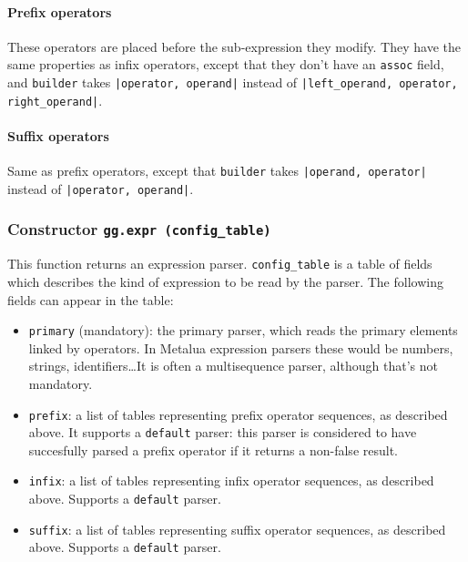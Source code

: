 

\paragraph{Prefix operators}
These operators are placed before the sub-expression they modify. They
have the same properties as infix operators, except that they don't
have an \verb|assoc| field, and \verb|builder| takes {\tt|operator,
  operand|} instead of {\tt|left\_operand, operator, right\_operand|}.

\paragraph{Suffix operators}
Same as prefix operators, except that \verb|builder| takes
{\tt|operand, operator|} instead of {\tt|operator, operand|}.

\subsubsection{Constructor {\tt gg.expr (config\_table)}}

This function returns an expression parser. \verb|config_table|
is a table of fields which describes the kind of expression to be
read by the parser. The following fields can appear in the table:

\begin{itemize}
\item\verb|primary| (mandatory): the primary parser, which reads the
  primary elements linked by operators. In Metalua expression parsers
  these would be numbers, strings, identifiers\ldots It is often a
  multisequence parser, although that's not mandatory.
\item\verb|prefix|: a list of tables representing prefix operator
  sequences, as described above. It supports a {\tt default} parser:
  this parser is considered to have succesfully parsed a prefix
  operator if it returns a non-false result.
\item\verb|infix|: a list of tables representing infix operator
  sequences, as described above. Supports a {\tt default} parser.
\item\verb|suffix|: a list of tables representing suffix operator
  sequences, as described above. Supports a {\tt default} parser.
\end{itemize}

